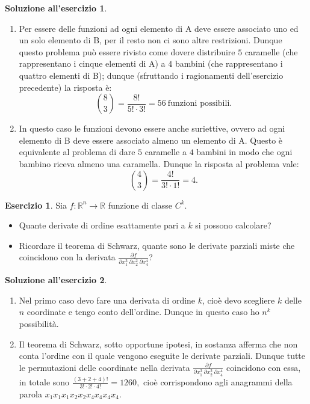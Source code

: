 \documentclass[12pt,a4paper]{article}
\theoremstyle{definition}
\newtheorem{sol}{Soluzione all'esercizio}
\newtheorem{exe}{Esercizio}
\begin{document}
\begin{sol}\mbox{}\vspace{-0.7cm}\\
	\begin{enumerate}
		\item Per essere delle funzioni ad ogni elemento di A deve essere associato uno ed un solo elemento di B, per il resto non ci sono altre restrizioni. Dunque questo problema può essere rivisto come dovere distribuire $ 5 $ caramelle (che rappresentano i cinque elementi di A) a $ 4 $ bambini (che rappresentano i quattro elementi di B); dunque (sfruttando i ragionamenti dell'esercizio precedente) la risposta è:
		      \[ \binom{8}{3} = \frac{8!}{5!\cdot3!} = 56 \ \text{funzioni possibili.} \]
		\item In questo caso le funzioni devono essere anche suriettive, ovvero ad ogni elemento di B deve essere associato almeno un elemento di A. Questo è equivalente al problema di dare $ 5 $ caramelle a $ 4 $ bambini in modo che ogni bambino riceva almeno una caramella. Dunque la risposta al problema vale:
		      \[ \binom{4}{3} = \frac{4!}{3!\cdot1!} = 4. \]
	\end{enumerate}
\end{sol}

\begin{exe}
	Sia $ f: \mathbb{R}^n \to \mathbb{R} $ funzione di classe $ C^k $.
	\begin{itemize}
		\item Quante derivate di ordine esattamente pari a $ k $ si possono calcolare?
		\item Ricordare il teorema di Schwarz, quante sono le derivate parziali miste che coincidono con la derivata $ \frac{\partial f}{\partial x_1^3\ \partial x_2^2\ \partial x_4^4} $?
	\end{itemize}
\end{exe}

\begin{sol}\mbox{}\vspace{-0.7cm}\\
	\begin{enumerate}
		\item Nel primo caso devo fare una derivata di ordine $ k $, cioè devo scegliere $ k $ delle $ n $ coordinate e tengo conto dell'ordine. Dunque in questo caso ho $ n^k $ possibilità.
		\item Il teorema di Schwarz, sotto opportune ipotesi, in sostanza afferma che non conta l'ordine con il quale vengono eseguite le derivate parziali. Dunque tutte le permutazioni delle coordinate nella derivata $ \frac{\partial f}{\partial x_1^3\ \partial x_2^2\ \partial x_4^4} $ coincidono con essa, in totale sono $ \frac{(3+2+4)!}{3!\cdot2!\cdot4!} = 1260, $ cioè corrispondono agli anagrammi della parola $ x_1x_1x_1x_2x_2x_4x_4x_4x_4 $.
	\end{enumerate}
\end{sol}
\end{document}
